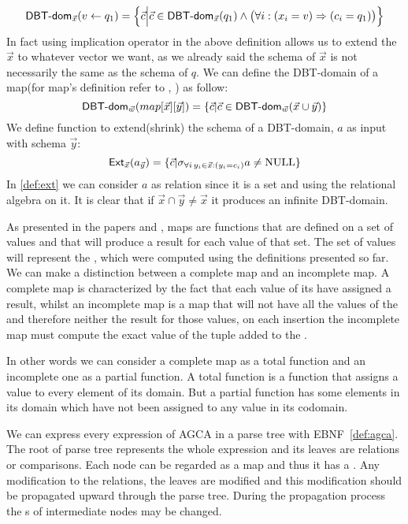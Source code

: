 \documentclass[12pt]{article}
\begin{document}
\begin{equation}
\label{assign2}
\text{\textsf{DBT-dom}{}}_{\vec{x}}(v\gets q_{1})=\Big\{\vec{c}\Big|\vec{c}\in\text{\textsf{DBT-dom}{}}_{\vec{x}}(q_{1})\land \big(\forall i: (x_{i}=v)\Rightarrow(c_{i}=q_{1})\big)\Big\}
\end{equation}
In fact using implication operator in the above definition allows us to extend the $\vec{x}$ to whatever vector we want, as we already said the schema of $\vec{x}$ is not necessarily the same as the schema of $q$. %
We can define the DBT-domain of a map(for map's definition refer to \cite{1}, \cite{2}) as follow:
\begin{equation}
\label{def:map}
\text{\textsf{DBT-dom}}_{\vec{w}}(map[\vec{x}][\vec{y}])=\{\vec{c}|\vec{c}\in\text{\textsf{DBT-dom}}_{\vec{w}}(\vec{x}\cup\vec{y})\}
\end{equation}
We define function \Ext{}  to extend(shrink) the schema of a DBT-domain, $a$ as input with schema $\vec{y}$:
\begin{equation}
\label{def:ext}
\text{\textsf{Ext}}_{\vec{x}}(a_{\vec{y}})=\{\vec{c}|\sigma_{\forall i\,y_{i}\in\vec{x}:(y_{i}=c_{i})}a\neq \text{NULL}\}
\end{equation}
In \eqref{def:ext} we can consider $a$ as relation since it is a set and using the relational algebra on it. 
It is clear that if $\vec{x}\cap\vec{y}\neq\vec{x}$ it produces an infinite DBT-domain. 

As presented in the papers \cite{1} and \cite{2}, maps are functions that are defined on a set of values and that will produce a result for each value of that set. The set of values will represent the \dom{}, which were computed using the definitions presented so far. We can make a distinction between a complete map and an incomplete map. A complete map is characterized by the fact that each value of its \dom{} have assigned a result, whilst an incomplete map is a map that will not have all the values of the \dom{} and therefore neither the result for those values, on each insertion the incomplete map must compute the exact value of the tuple added to the \dom{}.

In other words we can consider a complete map as a total function and an incomplete one as a partial function. A total function is a function that assigns a value to every element of its domain. But a partial function has some elements in its domain which have not been assigned to any value in its codomain. \par

We can express every expression of AGCA in a parse tree with EBNF~\ref{def:agca}. The root of parse tree represents the whole expression and its leaves are relations or comparisons. Each node can be regarded as a map and thus it has a \dom{}. Any modification to the relations, the leaves are modified and this modification should be propagated upward through the parse tree. During the propagation process the \dom{}s of intermediate nodes may be changed. 
\end{document}
